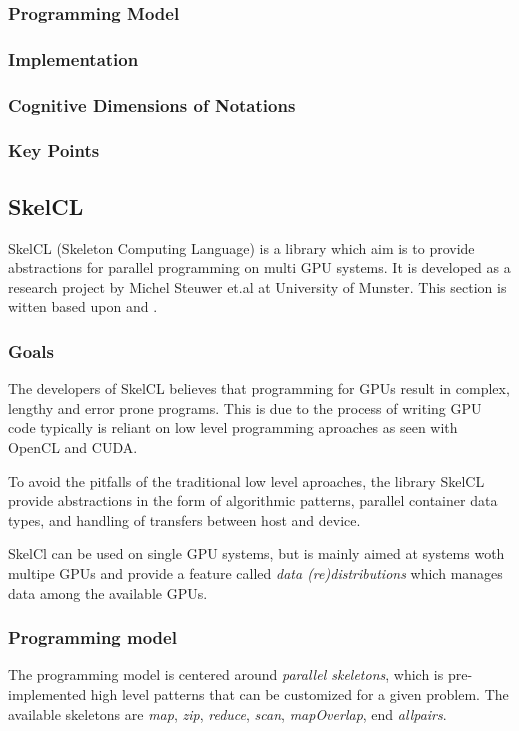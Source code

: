 \subsubsection{Programming Model}

\subsubsection{Implementation}

\subsubsection{Cognitive Dimensions of Notations}

\subsubsection{Key Points}


\subsection{SkelCL}
SkelCL (Skeleton Computing Language) is a library which aim is to provide abstractions for parallel programming on multi GPU systems. It is developed as a research project by Michel Steuwer et.al at University of Munster. This section is witten based upon \cite{skelclWebsite} and \cite{skelclPaper}.

\subsubsection{Goals}
The developers of SkelCL believes that programming for GPUs result in complex, lengthy and error prone programs. This is due to the process of writing GPU code typically is reliant on low level programming aproaches as seen with OpenCL and CUDA. 

To avoid the pitfalls of the traditional low level aproaches, the library SkelCL provide abstractions in the form of algorithmic patterns, parallel container data types, and handling of transfers between host and device. 

SkelCl can be used on single GPU systems, but is mainly aimed at systems woth multipe GPUs and provide a feature called \textit{data (re)distributions} which manages data among the available GPUs.

\subsubsection{Programming model}
The programming model is centered around \textit{parallel skeletons}, which is pre-implemented high level patterns that can be customized for a given problem. The available skeletons are \textit{map}, \textit{zip}, \textit{reduce}, \textit{scan}, \textit{mapOverlap}, end \textit{allpairs}.

